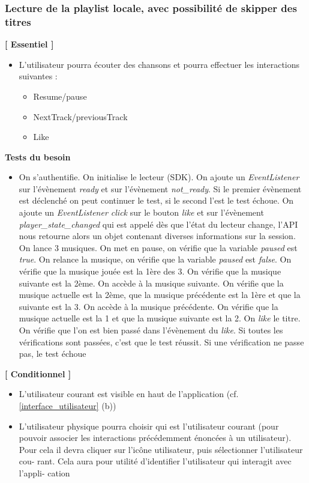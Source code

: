 \documentclass{article}
\begin{document}
		\subsubsection{Lecture de la playlist locale, avec possibilité de skipper des titres} \label{lecture}
		\textbf{[ Essentiel ]} 
		\begin{itemize}
			\item L'utilisateur pourra écouter des chansons et pourra effectuer les interactions suivantes :
			      \begin{itemize}
			      	\item Resume/pause
			      	\item NextTrack/previousTrack
			      	\item Like
			      \end{itemize}
		\end{itemize}
		\textbf{Tests du besoin}
		\begin{itemize}
			\item On s’authentifie. On initialise le lecteur (SDK). On ajoute un \textit{EventListener} sur l'évènement \textit{ready} et sur l'évènement \textit{not\_ready}. Si le premier évènement est déclenché on peut continuer le test, si le second l'est le test échoue. On ajoute un \textit{EventListener click} sur le bouton \textit{like} et sur l'évènement \textit{player\_state\_changed} qui est appelé dès que l'état du lecteur change, l'API nous retourne alors un objet contenant diverses informations sur la session. On lance 3 musiques. On met en pause, on vérifie que la variable \textit{paused} est \textit{true}. On relance la musique, on vérifie que la variable \textit{paused} est \textit{false}. On vérifie que la musique jouée est la 1ère des 3. On vérifie que la musique suivante est la 2ème. On accède à la musique suivante. On vérifie que la musique actuelle est la 2ème, que la musique précédente est la 1ère et que la suivante est la 3. On accède à la musique précédente. On vérifie que la musique actuelle est la 1 et que la musique suivante est la 2. On  \textit{like} le titre. On vérifie que l'on est bien passé dans l'évènement du \textit{like}. Si toutes les vérifications sont passées, c'est que le test réussit. Si une vérification ne passe pas, le test échoue
		\end{itemize}
		\textbf{[ Conditionnel ]}
		\begin{itemize}
			\item L'utilisateur courant est visible en haut de l'application (cf. \ref{interface_utilisateur} (b)) 
			\item L'utilisateur physique pourra choisir qui est l'utilisateur courant (pour pouvoir associer les interactions précédemment énoncées à un utilisateur). Pour cela il devra cliquer sur l'icône utilisateur, puis sélectionner l'utilisateur cou- rant. Cela aura pour utilité d'identifier l'utilisateur qui interagit avec l'appli- cation
		\end{itemize}
\end{document}
